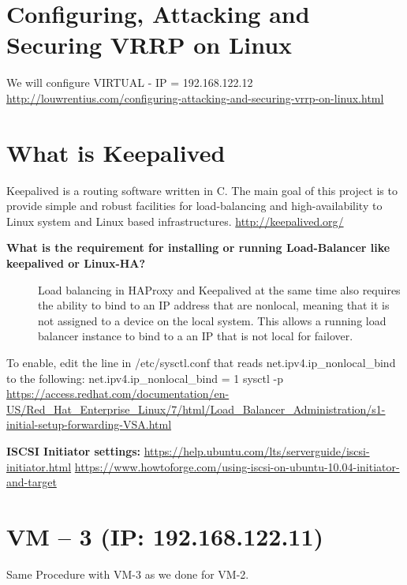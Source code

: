 \documentclass[letterpaper,10pt,english]{sphinxmanual}
\begin{document}
\section{Configuring, Attacking and Securing VRRP on Linux}
\label{week-13:configuring-attacking-and-securing-vrrp-on-linux}
We will configure VIRTUAL - IP = 192.168.122.12
\href{http://louwrentius.com/configuring-attacking-and-securing-vrrp-on-linux.html}{http://louwrentius.com/configuring-attacking-and-securing-vrrp-on-linux.html}


\section{What is Keepalived}
\label{week-13:what-is-keepalived}
Keepalived is a routing software written in C. The main goal of this project is to provide simple and robust facilities for load-balancing and high-availability to Linux system and Linux based infrastructures.
\href{http://keepalived.org/}{http://keepalived.org/}
\begin{description}
\item[{\textbf{What is the requirement for installing or running Load-Balancer like keepalived or Linux-HA?}}] \leavevmode
Load balancing in HAProxy and Keepalived at the same time also requires the ability to bind to an IP address that are nonlocal, meaning that it is not assigned to a device on the local system. This allows a running load balancer instance to bind to a an IP that is not local for failover.

\end{description}

To enable, edit the line in /etc/sysctl.conf that reads net.ipv4.ip\_nonlocal\_bind to the following:
net.ipv4.ip\_nonlocal\_bind = 1
sysctl -p
\href{https://access.redhat.com/documentation/en-US/Red\_Hat\_Enterprise\_Linux/7/html/Load\_Balancer\_Administration/s1-initial-setup-forwarding-VSA.html}{https://access.redhat.com/documentation/en-US/Red\_Hat\_Enterprise\_Linux/7/html/Load\_Balancer\_Administration/s1-initial-setup-forwarding-VSA.html}

\textbf{ISCSI Initiator settings:}
\href{https://help.ubuntu.com/lts/serverguide/iscsi-initiator.html}{https://help.ubuntu.com/lts/serverguide/iscsi-initiator.html}
\href{https://www.howtoforge.com/using-iscsi-on-ubuntu-10.04-initiator-and-target}{https://www.howtoforge.com/using-iscsi-on-ubuntu-10.04-initiator-and-target}


\section{VM – 3 (IP: 192.168.122.11)}
\label{week-13:vm-3-ip-192-168-122-11}
Same Procedure with VM-3 as we done for VM-2.
\end{document}

